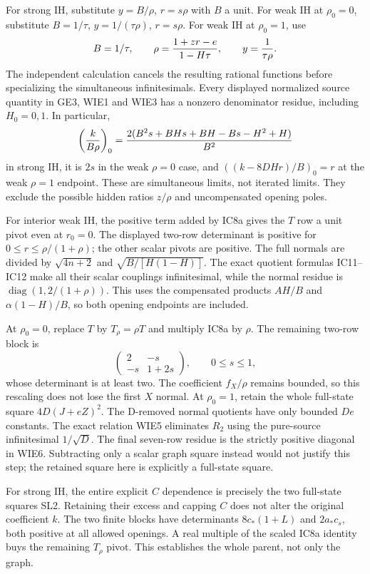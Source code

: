 For strong IH, substitute $y=B/\rho$, $r=s\rho$ with $B$ a unit.
For weak IH at $\rho_0=0$, substitute
$B=1/\tau$, $y=1/(\tau\rho)$, $r=s\rho$.
For weak IH at $\rho_0=1$, use
\[
 B=1/\tau,\qquad
 \rho={1+zr-e\over1-H\tau},\qquad y={1\over\tau\rho}.
\]
The independent calculation cancels the resulting rational functions
before specializing the simultaneous infinitesimals. Every displayed
normalized source quantity in GE3, WIE1 and WIE3 has a nonzero
denominator residue, including $H_0=0,1$. In particular,
\[
 \left({k\over B\rho}\right)_0
 ={2(B^2s+BHs+BH-Bs-H^2+H)\over B^2}
\]
in strong IH, it is $2s$ in the weak $\rho=0$ case, and
$((k-8DHr)/B)_0=r$ at the weak $\rho=1$ endpoint.
These are simultaneous limits, not iterated limits. They exclude the
possible hidden ratios $z/\rho$ and uncompensated opening poles.

For interior weak IH, the positive term added by IC8a gives the $T$
row a unit pivot even at $r_0=0$. The displayed two-row determinant
is positive for $0\le r\le\rho/(1+\rho)$; the other scalar pivots
are positive. The full normals are divided by
$\sqrt{4n+2}$ and $\sqrt{B/[H(1-H)]}$. The exact quotient formulas
IC11--IC12 make all their scalar couplings infinitesimal, while the
normal residue is $\operatorname{diag}(1,2/(1+\rho))$. This uses the
compensated products $AH/B$ and $\alpha(1-H)/B$, so both opening
endpoints are included.

At $\rho_0=0$, replace $T$ by $T_\rho=\rho T$ and multiply IC8a
by $\rho$. The remaining two-row block is
\[
 \begin{pmatrix}2&-s\\-s&1+2s\end{pmatrix},\qquad 0\le s\le1,
\]
whose determinant is at least two. The coefficient $f_X/\rho$
remains bounded, so this rescaling does not lose the first $X$ normal.
At $\rho_0=1$, retain the whole full-state square
$4D(J+eZ)^2$. The D-removed normal quotients have only bounded
$De$ constants. The exact relation WIE5 eliminates $R_2$ using the
pure-source infinitesimal $1/\sqrt D$. The final seven-row residue
is the strictly positive diagonal in WIE6. Subtracting only a scalar
graph square instead would not justify this step; the retained square
here is explicitly a full-state square.

For strong IH, the entire explicit $C$ dependence is precisely the
two full-state squares SL2. Retaining their excess and capping $C$
does not alter the original coefficient $k$. The two finite blocks
have determinants $8c_*(1+L)$ and $2a_*c_s$, both positive at all
allowed openings. A real multiple of the scaled IC8a identity buys
the remaining $T_\rho$ pivot. This establishes the whole parent,
not only the graph.

